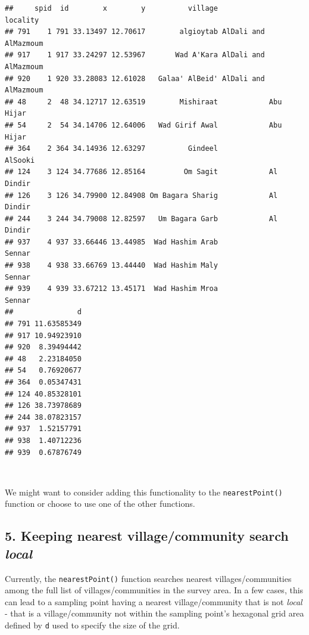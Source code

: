 \documentclass[11pt,a4paper]{article}
\begin{document}
\begin{verbatim}
##     spid  id        x        y          village             locality
## 791    1 791 33.13497 12.70617        algioytab AlDali and AlMazmoum
## 917    1 917 33.24297 12.53967       Wad A'Kara AlDali and AlMazmoum
## 920    1 920 33.28083 12.61028   Galaa' AlBeid' AlDali and AlMazmoum
## 48     2  48 34.12717 12.63519        Mishiraat            Abu Hijar
## 54     2  54 34.14706 12.64006   Wad Girif Awal            Abu Hijar
## 364    2 364 34.14936 12.63297          Gindeel              AlSooki
## 124    3 124 34.77686 12.85164         Om Sagit            Al Dindir
## 126    3 126 34.79900 12.84908 Om Bagara Sharig            Al Dindir
## 244    3 244 34.79008 12.82597   Um Bagara Garb            Al Dindir
## 937    4 937 33.66446 13.44985  Wad Hashim Arab               Sennar
## 938    4 938 33.66769 13.44440  Wad Hashim Maly               Sennar
## 939    4 939 33.67212 13.45171  Wad Hashim Mroa               Sennar
##               d
## 791 11.63585349
## 917 10.94923910
## 920  8.39494442
## 48   2.23184050
## 54   0.76920677
## 364  0.05347431
## 124 40.85328101
## 126 38.73978689
## 244 38.07823157
## 937  1.52157791
## 938  1.40712236
## 939  0.67876749
\end{verbatim}

~

We might want to consider adding this functionality to the
\texttt{nearestPoint()} function or choose to use one of the other
functions.

\newpage

\hypertarget{keeping-nearest-villagecommunity-search-local}{%
\subsection{\texorpdfstring{5. Keeping nearest village/community search
\emph{local}}{5. Keeping nearest village/community search local}}\label{keeping-nearest-villagecommunity-search-local}}

Currently, the \texttt{nearestPoint()} function searches nearest
villages/communities among the full list of villages/communities in the
survey area. In a few cases, this can lead to a sampling point having a
nearest village/community that is not \emph{local} - that is a
village/community not within the sampling point's hexagonal grid area
defined by \texttt{d} used to specify the size of the grid.

~
\end{document}
